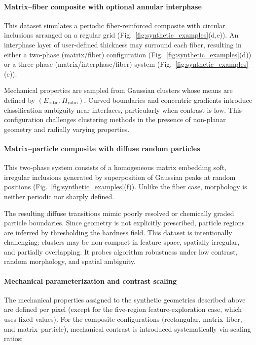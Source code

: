 \documentclass[final,3p,times]{elsarticle}
\begin{document}
\paragraph{Matrix--fiber composite with optional annular interphase}

This dataset simulates a periodic fiber-reinforced composite with circular inclusions arranged on a regular grid (Fig.~\ref{fig:synthetic_examples}(d,e)). An interphase layer of user-defined thickness may surround each fiber, resulting in either a two-phase (matrix/fiber) configuration (Fig.~\ref{fig:synthetic_examples}(d)) or a three-phase (matrix/interphase/fiber) system (Fig.~\ref{fig:synthetic_examples}(e)).

Mechanical properties are sampled from Gaussian clusters whose means are defined by $(E_\mathrm{ratio}, H_\mathrm{ratio})$. Curved boundaries and concentric gradients introduce classification ambiguity near interfaces, particularly when contrast is low. This configuration challenges clustering methods in the presence of non-planar geometry and radially varying properties.

\paragraph{Matrix--particle composite with diffuse random particles}

This two-phase system consists of a homogeneous matrix embedding soft, irregular inclusions generated by superposition of Gaussian peaks at random positions (Fig.~\ref{fig:synthetic_examples}(f)). Unlike the fiber case, morphology is neither periodic nor sharply defined.

The resulting diffuse transitions mimic poorly resolved or chemically graded particle boundaries. Since geometry is not explicitly prescribed, particle regions are inferred by thresholding the hardness field. This dataset is intentionally challenging: clusters may be non-compact in feature space, spatially irregular, and partially overlapping. It probes algorithm robustness under low contrast, random morphology, and spatial ambiguity.

\paragraph{Mechanical parameterization and contrast scaling}

The mechanical properties assigned to the synthetic geometries described above are defined per pixel (except for the five-region feature-exploration case, which uses fixed values). For the composite configurations (rectangular, matrix--fiber, and matrix--particle), mechanical contrast is introduced systematically via scaling ratios:
\end{document}
